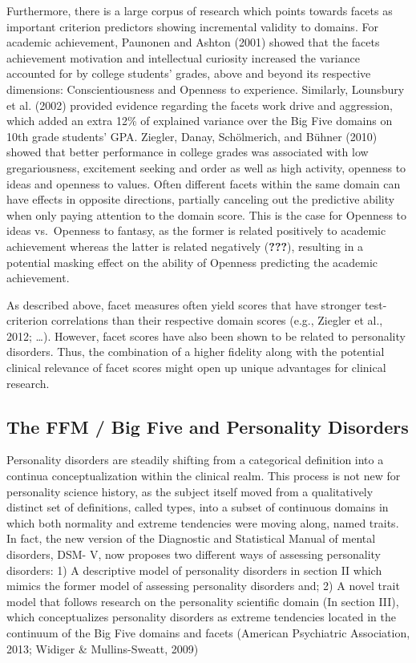 \documentclass[,man]{apa6}
\theoremstyle{definition}
\theoremstyle{definition}
\theoremstyle{definition}
\theoremstyle{remark}
\begin{document}
Furthermore, there is a large corpus of research which points towards
facets as important criterion predictors showing incremental validity to
domains. For academic achievement, Paunonen and Ashton (2001) showed
that the facets achievement motivation and intellectual curiosity
increased the variance accounted for by college students' grades, above
and beyond its respective dimensions: Conscientiousness and Openness to
experience. Similarly, Lounsbury et al. (2002) provided evidence
regarding the facets work drive and aggression, which added an extra
12\% of explained variance over the Big Five domains on 10th grade
students' GPA. Ziegler, Danay, Schölmerich, and Bühner (2010) showed
that better performance in college grades was associated with low
gregariousness, excitement seeking and order as well as high activity,
openness to ideas and openness to values. Often different facets within
the same domain can have effects in opposite directions, partially
canceling out the predictive ability when only paying attention to the
domain score. This is the case for Openness to ideas vs.~Openness to
fantasy, as the former is related positively to academic achievement
whereas the latter is related negatively ({\textbf{???}}), resulting in
a potential masking effect on the ability of Openness predicting the
academic achievement.

As described above, facet measures often yield scores that have stronger
test-criterion correlations than their respective domain scores (e.g.,
Ziegler et al., 2012; \ldots{}). However, facet scores have also been
shown to be related to personality disorders. Thus, the combination of a
higher fidelity along with the potential clinical relevance of facet
scores might open up unique advantages for clinical research.

\hypertarget{the-ffm-big-five-and-personality-disorders}{%
\subsection{The FFM / Big Five and Personality
Disorders}\label{the-ffm-big-five-and-personality-disorders}}

Personality disorders are steadily shifting from a categorical
definition into a continua conceptualization within the clinical realm.
This process is not new for personality science history, as the subject
itself moved from a qualitatively distinct set of definitions, called
types, into a subset of continuous domains in which both normality and
extreme tendencies were moving along, named traits. In fact, the new
version of the Diagnostic and Statistical Manual of mental disorders,
DSM- V, now proposes two different ways of assessing personality
disorders: 1) A descriptive model of personality disorders in section II
which mimics the former model of assessing personality disorders and; 2)
A novel trait model that follows research on the personality scientific
domain (In section III), which conceptualizes personality disorders as
extreme tendencies located in the continuum of the Big Five domains and
facets (American Psychiatric Association, 2013; Widiger \&
Mullins-Sweatt, 2009)
\end{document}
